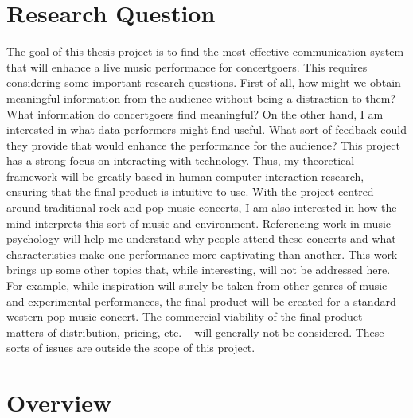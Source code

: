
\section{Research Question}

The goal of this thesis project is to find the most effective communication system that will enhance a live music performance for concertgoers. This requires considering some important research questions. First of all, how might we obtain meaningful information from the audience without being a distraction to them? What information do concertgoers find meaningful? On the other hand, I am interested in what data performers might find useful. What sort of feedback could they provide that would enhance the performance for the audience? This project has a strong focus on interacting with technology. Thus, my theoretical framework will be greatly based in human-computer interaction research, ensuring that the final product is intuitive to use. With the project centred around traditional rock and pop music concerts, I am also interested in how the mind interprets this sort of music and environment. Referencing work in music psychology will help me understand why people attend these concerts and what characteristics make one performance more captivating than another. This work brings up some other topics that, while interesting, will not be addressed here. For example, while inspiration will surely be taken from other genres of music and experimental performances, the final product will be created for a standard western pop music concert. The commercial viability of the final product -- matters of distribution, pricing, etc. -- will generally not be considered.  These sorts of issues are outside the scope of this project.

\section{Overview}

